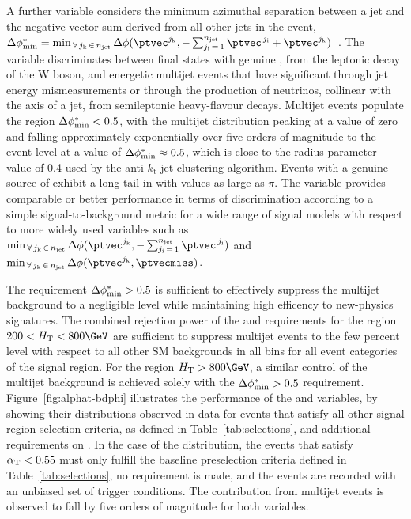 A further variable considers the minimum azimuthal separation between
a jet and the negative vector \ptvec sum derived from all other jets
in the event, $\bdphi = \min_{\,\forall\, j_\text{k} \,\in\, \njet}
\Delta\phi(\ptvec^{j_\text{k}}, -\sum_{j_\text{i}\, =\, 1}^{\njet}
\ptvec^{\,j_\text{i}} + \ptvec^{j_\text{k}})$~\cite{RA1Paper}. The
variable discriminates between final states with genuine \ptvecmiss,
\eg from the leptonic decay of the W boson, and energetic multijet
events that have significant \ptvecmiss through jet energy
mismeasurements or through the production of neutrinos, collinear with
the axis of a jet, from semileptonic heavy-flavour decays. Multijet
events populate the region $\mbox{$\Delta\phi^{*}_{\rm min}$} < 0.5$, with the multijet
distribution peaking at a value of zero and falling approximately
exponentially over five orders of magnitude to the event level at a
value of $\mbox{$\Delta\phi^{*}_{\rm min}$} \approx 0.5$, which is close to the radius parameter
value of 0.4 used by the anti-$k_\text{t}$ jet clustering
algorithm. Events with a genuine source of \ptvecmiss exhibit a long
tail in \bdphi with values as large as $\pi$. The \bdphi variable
provides comparable or better performance in terms of discrimination
according to a simple signal-to-background metric for a wide range of
signal models with respect to more widely used variables such as
$\min_{\,\forall\, j_\text{k} \,\in\, \njet}
\Delta\phi(\ptvec^{j_\text{k}}, -\sum_{j_\text{i}\, =\, 1}^{\njet}
\ptvec^{\,j_\text{i}})$ and $\min_{\,\forall\, j_\text{k} \,\in\,
  \njet} \Delta\phi(\ptvec^{j_\text{k}}, \ptvecmiss)$.

The requirement $\mbox{$\Delta\phi^{*}_{\rm min}$} > 0.5$ is sufficient to effectively suppress
the multijet background to a negligible level while maintaining high
efficency to new-physics signatures. The combined rejection power of
the \alphat and \bdphi requirements for the region $200 < \scalht <
800\GeV$ are sufficient to suppress multijet events to the few percent
level with respect to all other SM backgrounds in all \scalht bins for
all event categories of the signal region. For the region $\scalht >
800\GeV$, a similar control of the multijet background is achieved
solely with the $\mbox{$\Delta\phi^{*}_{\rm min}$} > 0.5$
requirement. Figure~\ref{fig:alphat-bdphi} illustrates the performance
of the \alphat and \bdphi variables, by showing their distributions
observed in data for events that satisfy all other signal region
selection criteria, as defined in Table~\ref{tab:selections}, and
additional requirements on \scalht. In the case of the \alphat
distribution, the events that satisfy $\alpha_{\text{T}} < 0.55$ must only
fulfill the baseline preselection criteria defined in
Table~\ref{tab:selections}, no \HTmiss requirement is made, and the
events are recorded with an unbiased set of trigger \scalht
conditions. The contribution from multijet events is observed to fall
by five orders of magnitude for both variables.

